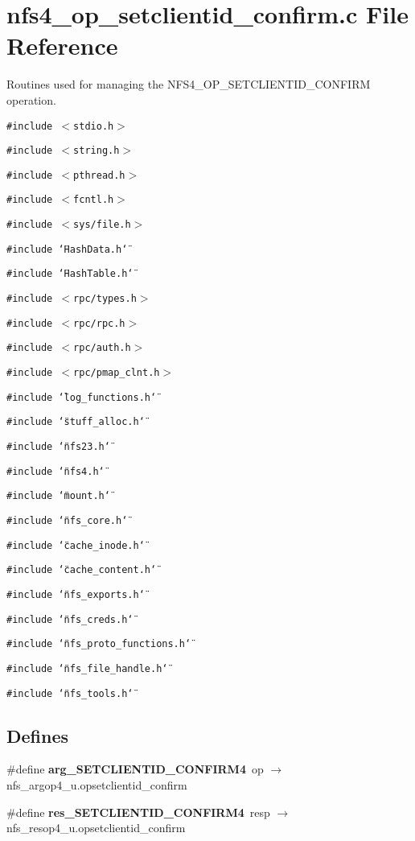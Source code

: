 \section{nfs4\_\-op\_\-setclientid\_\-confirm.c File Reference}
\label{nfs4__op__setclientid__confirm_8c}
Routines used for managing the NFS4\_\-OP\_\-SETCLIENTID\_\-CONFIRM operation. 

{\tt \#include $<$stdio.h$>$}\par
{\tt \#include $<$string.h$>$}\par
{\tt \#include $<$pthread.h$>$}\par
{\tt \#include $<$fcntl.h$>$}\par
{\tt \#include $<$sys/file.h$>$}\par
{\tt \#include \char`\"{}Hash\-Data.h\char`\"{}}\par
{\tt \#include \char`\"{}Hash\-Table.h\char`\"{}}\par
{\tt \#include $<$rpc/types.h$>$}\par
{\tt \#include $<$rpc/rpc.h$>$}\par
{\tt \#include $<$rpc/auth.h$>$}\par
{\tt \#include $<$rpc/pmap\_\-clnt.h$>$}\par
{\tt \#include \char`\"{}log\_\-functions.h\char`\"{}}\par
{\tt \#include \char`\"{}stuff\_\-alloc.h\char`\"{}}\par
{\tt \#include \char`\"{}nfs23.h\char`\"{}}\par
{\tt \#include \char`\"{}nfs4.h\char`\"{}}\par
{\tt \#include \char`\"{}mount.h\char`\"{}}\par
{\tt \#include \char`\"{}nfs\_\-core.h\char`\"{}}\par
{\tt \#include \char`\"{}cache\_\-inode.h\char`\"{}}\par
{\tt \#include \char`\"{}cache\_\-content.h\char`\"{}}\par
{\tt \#include \char`\"{}nfs\_\-exports.h\char`\"{}}\par
{\tt \#include \char`\"{}nfs\_\-creds.h\char`\"{}}\par
{\tt \#include \char`\"{}nfs\_\-proto\_\-functions.h\char`\"{}}\par
{\tt \#include \char`\"{}nfs\_\-file\_\-handle.h\char`\"{}}\par
{\tt \#include \char`\"{}nfs\_\-tools.h\char`\"{}}\par
\subsection*{Defines}
\begin{CompactItemize}
\item 
\#define {\bf arg\_\-SETCLIENTID\_\-CONFIRM4}\ op $\rightarrow$ nfs\_\-argop4\_\-u.opsetclientid\_\-confirm
\item 
\#define {\bf res\_\-SETCLIENTID\_\-CONFIRM4}\ resp $\rightarrow$ nfs\_\-resop4\_\-u.opsetclientid\_\-confirm
\end{CompactItemize}
